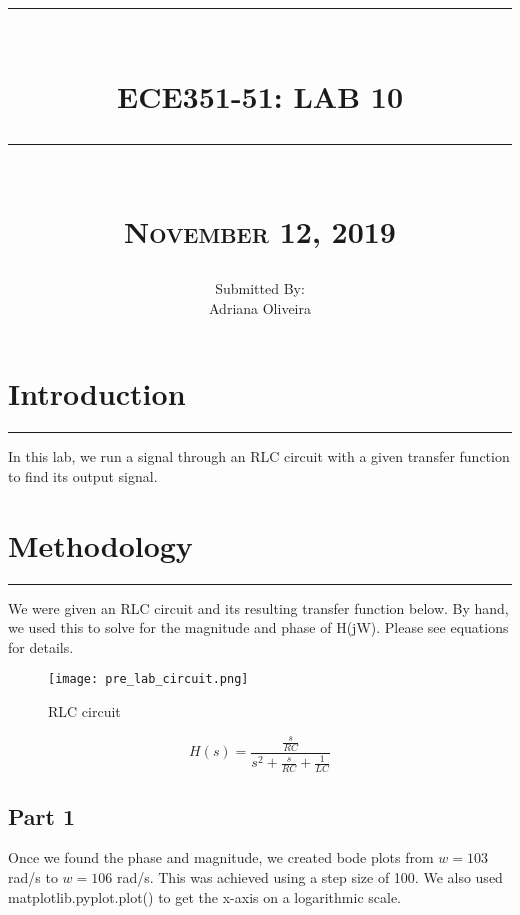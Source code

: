 \documentclass[12pt]{report}
\newcommand{\HRule}[1]{\rule{\linewidth}{#1}}
\begin{document}
\title{ 
		\\ [2.0cm]
		\HRule{0.5pt} \\
		\LARGE \textbf{\uppercase{ECE351-51: Lab 10}} 
		\HRule{2pt} \\ [0.5cm]
		\normalsize\textsc{November 12, 2019} \vspace*{5\baselineskip}}

\date{}
\author{\normalsize
		Submitted By: \\
		\normalsize Adriana Oliveira\\}

\maketitle

\newpage

\sectionfont{\scshape}
\section*{Introduction}
\hrule
\vspace{1cm}
\setlength{\parindent}{5ex}
In this lab, we run a signal through an RLC circuit with a given transfer function to find its output signal. 

\section*{Methodology}
\hrule
\vspace{1cm}
\setlength{\parindent}{5ex}
\sectionfont{\scshape}

We were given an RLC circuit and its resulting transfer function below. By hand, we used this to solve for the magnitude and phase of H(jW). Please see equations for details.  \par

\vspace{1.5cm}
\begin{figure}[htp]
     \centering
     \texttt{[image: pre\_lab\_circuit.png]}
     \caption{RLC circuit}
     \label{fig:my_label}
 \end{figure}
\vspace{1cm}
$$H(s) = \frac {\frac{s}{RC}} {s^{2} + \frac {s}{RC} + \frac{1}{LC}} $$

\vspace{-0.5cm}
\subsection*{Part 1}
\setlength{\parindent}{5ex}
Once we found the phase and magnitude, we created bode plots from $w = 103$ rad/s to $w = 106$ rad/s. This was achieved using a step size of 100. We also used matplotlib.pyplot.plot() to get the x-axis on a logarithmic scale. \par
\end{document}
